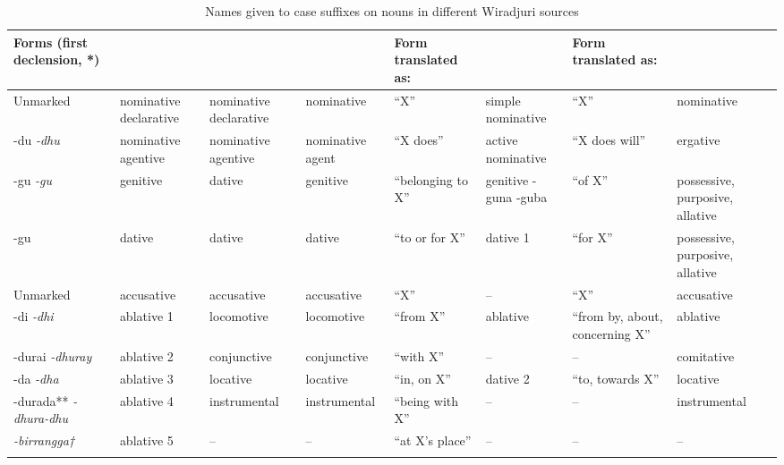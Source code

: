 \begin{sidewaystable}
{\footnotesize
    \begin{tabularx}{\textwidth}{QQQQQQQQ}
        \lsptoprule
        {Forms (first declension, \citealt[58]{fraser_introduction_1892}*)} & \citet{Günther1838}  & \citet{gunther_lecture_1840} & \citet{fraser_introduction_1892} & {Form translated as:} & \citet{hale_languages_1846} & {Form translated as: } & \citet{GrantRudder2001,GrantRudder2014}\\
        \midrule 
        Unmarked & {nominative declarative} & {nominative declarative} &	{nominative}	& {``X''} &	{simple nominative} & {``X''} &	{nominative}\\
        {-du \textit{-dhu}} & {nominative agentive} & {nominative agentive} &	{nominative agent}	& {``X does''} &	{active nominative} & {``X does will''} &	{ergative}\\
        {-gu \textit{-gu}} & {genitive} & {dative} &	{genitive}	& {``belonging to X''} &	{genitive -guna -guba} & {``of X''} &	{possessive, purposive, allative}\\
        {-gu} & {dative} & dative  &	{dative}	& {``to or for X''} &	{dative 1} & {``for X''} &{possessive, purposive, allative}\\
        Unmarked & {accusative} & {accusative} &	{accusative}	& {``X''} & – & {``X''} &	{accusative}\\
        {-di \textit{-dhi}} & {ablative 1} & {locomotive} &	{locomotive}	& {``from X''} & {ablative} & {``from by, about, concerning X''} &	{ablative}\\
        {-durai \textit{-dhuray}} & {ablative 2} & {conjunctive} &	{conjunctive}	& {``with X''} & – & – &	{comitative}\\
        {-da \textit{-dha}} & {ablative 3} & {locative} &	{locative}	& {``in, on X''} & {dative 2} & {``to, towards X''} &	{locative}\\
        {-durada** \textit{-dhura-dhu}} & {ablative 4} & {instrumental} &	{instrumental}	& {``being with X''} & – & – &	{instrumental}\\
        {\textit{-birrangga†}} & {ablative 5} & – &	–	& {``at X's place''} & – & – &–\\
        \lspbottomrule
    \end{tabularx}
    }
    \caption{Names given to case suffixes on nouns in different Wiradjuri sources}
    \label{tab:chap4:names}
\end{sidewaystable}
				 			


